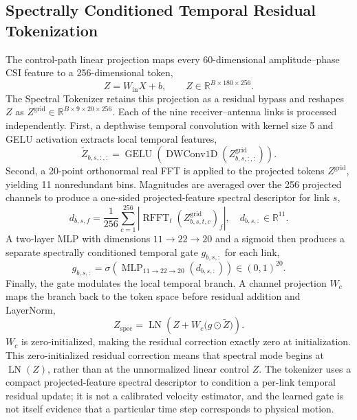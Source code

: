 \documentclass[conference,onecolumn]{IEEEtran}
\begin{document}
\subsection{Spectrally Conditioned Temporal Residual Tokenization}
The control-path linear projection maps every 60-dimensional amplitude--phase CSI feature to a 256-dimensional token,
\begin{equation}
Z=W_{\mathrm{in}}X+b,\qquad Z\in\mathbb{R}^{B\times180\times256}.
\label{eq:token-proj}
\end{equation}
The Spectral Tokenizer retains this projection as a residual bypass and reshapes $Z$ as $Z^{\mathrm{grid}}\in\mathbb R^{B\times9\times20\times256}$. Each of the nine receiver--antenna links is processed independently. First, a depthwise temporal convolution with kernel size 5 and GELU activation extracts local temporal features,
\begin{equation}
\tilde Z_{b,s,:,:}=\operatorname{GELU}\!\left(
\operatorname{DWConv1D}(Z^{\mathrm{grid}}_{b,s,:,:})\right).
\label{eq:token-conv}
\end{equation}
Second, a 20-point orthonormal real FFT is applied to the projected tokens $Z^{\mathrm{grid}}$, yielding 11 nonredundant bins. Magnitudes are averaged over the 256 projected channels to produce a one-sided projected-feature spectral descriptor for link $s$,
\begin{equation}
d_{b,s,f}=\frac{1}{256}\sum_{c=1}^{256}
\left|\operatorname{RFFT}_{t}\!\left(Z^{\mathrm{grid}}_{b,s,t,c}\right)_f\right|,
\quad d_{b,s,:}\in\mathbb R^{11}.
\label{eq:token-gate}
\end{equation}
A two-layer MLP with dimensions $11\rightarrow22\rightarrow20$ and a sigmoid then produces a separate spectrally conditioned temporal gate $g_{b,s,:}$ for each link,
\begin{equation}
g_{b,s,:}=\sigma\!\left(\operatorname{MLP}_{11\rightarrow22\rightarrow20}
(d_{b,s,:})\right)\in(0,1)^{20}.
\label{eq:token-temporal-gate}
\end{equation}
Finally, the gate modulates the local temporal branch. A channel projection $W_c$ maps the branch back to the token space before residual addition and LayerNorm,
\begin{equation}
Z_{\mathrm{spec}}=\operatorname{LN}\!\left(Z+W_c\big(g\odot\tilde Z\big)\right).
\label{eq:token-fusion}
\end{equation}
$W_c$ is zero-initialized, making the residual correction exactly zero at initialization. This zero-initialized residual correction means that spectral mode begins at $\operatorname{LN}(Z)$, rather than at the unnormalized linear control $Z$. The tokenizer uses a compact projected-feature spectral descriptor to condition a per-link temporal residual update; it is not a calibrated velocity estimator, and the learned gate is not itself evidence that a particular time step corresponds to physical motion.
\end{document}
